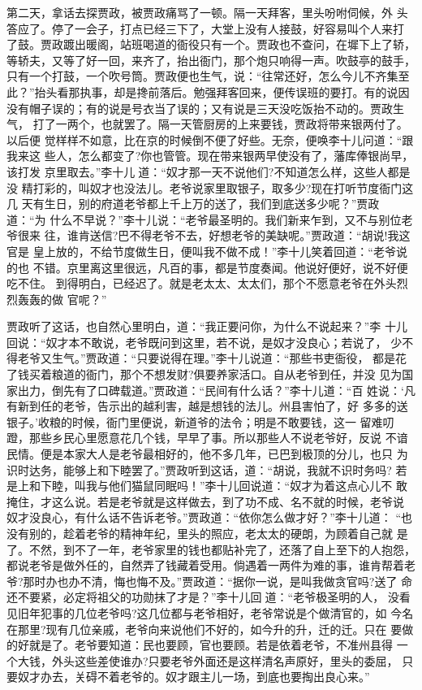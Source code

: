 第二天，拿话去探贾政，被贾政痛骂了一顿。隔一天拜客，里头吩咐伺候，外
头答应了。停了一会子，打点已经三下了，大堂上没有人接鼓，好容易叫个人来打
了鼓。贾政踱出暖阁，站班喝道的衙役只有一个。贾政也不查问，在墀下上了轿，
等轿夫，又等了好一回，来齐了，抬出衙门，那个炮只响得一声。吹鼓亭的鼓手，
只有一个打鼓，一个吹号筒。贾政便也生气，说：“往常还好，怎么今儿不齐集至
此？”抬头看那执事，却是搀前落后。勉强拜客回来，便传误班的要打。有的说因
没有帽子误的；有的说是号衣当了误的；又有说是三天没吃饭抬不动的。贾政生气，
打了一两个，也就罢了。隔一天管厨房的上来要钱，贾政将带来银两付了。以后便
觉样样不如意，比在京的时候倒不便了好些。无奈，便唤李十儿问道：“跟我来这
些人，怎么都变了?你也管管。现在带来银两早使没有了，藩库俸银尚早，该打发
京里取去。”李十儿道：“奴才那一天不说他们?不知道怎么样，这些人都是没
精打彩的，叫奴才也没法儿。老爷说家里取银子，取多少?现在打听节度衙门这几
天有生日，别的府道老爷都上千上万的送了，我们到底送多少呢？”贾政道：“为
什么不早说？”李十儿说：“老爷最圣明的。我们新来乍到，又不与别位老爷很来
往，谁肯送信?巴不得老爷不去，好想老爷的美缺呢。”贾政道：“胡说!我这官是
皇上放的，不给节度做生日，便叫我不做不成！”李十儿笑着回道：“老爷说的也
不错。京里离这里很远，凡百的事，都是节度奏闻。他说好便好，说不好便吃不住。
到得明白，已经迟了。就是老太太、太太们，那个不愿意老爷在外头烈烈轰轰的做
官呢？”

贾政听了这话，也自然心里明白，道：“我正要问你，为什么不说起来？”李
十儿回说：“奴才本不敢说，老爷既问到这里，若不说，是奴才没良心；若说了，
少不得老爷又生气。”贾政道：“只要说得在理。”李十儿说道：“那些书吏衙役，
都是花了钱买着粮道的衙门，那个不想发财?俱要养家活口。自从老爷到任，并没
见为国家出力，倒先有了口碑载道。”贾政道：“民间有什么话？”李十儿道：“百
姓说：‘凡有新到任的老爷，告示出的越利害，越是想钱的法儿。州县害怕了，好
多多的送银子。’收粮的时候，衙门里便说，新道爷的法令；明是不敢要钱，这一
留难叨蹬，那些乡民心里愿意花几个钱，早早了事。所以那些人不说老爷好，反说
不谙民情。便是本家大人是老爷最相好的，他不多几年，已巴到极顶的分儿，也只
为识时达务，能够上和下睦罢了。”贾政听到这话，道：“胡说，我就不识时务吗?
若是上和下睦，叫我与他们猫鼠同眠吗！”李十儿回说道：“奴才为着这点心儿不
敢掩住，才这么说。若是老爷就是这样做去，到了功不成、名不就的时候，老爷说
奴才没良心，有什么话不告诉老爷。”贾政道：“依你怎么做才好？”李十儿道：
“也没有别的，趁着老爷的精神年纪，里头的照应，老太太的硬朗，为顾着自己就
是了。不然，到不了一年，老爷家里的钱也都贴补完了，还落了自上至下的人抱怨，
都说老爷是做外任的，自然弄了钱藏着受用。倘遇着一两件为难的事，谁肯帮着老
爷?那时办也办不清，悔也悔不及。”贾政道：“据你一说，是叫我做贪官吗?送了
命还不要紧，必定将祖父的功勋抹了才是？”李十儿回道：“老爷极圣明的人，
没看见旧年犯事的几位老爷吗?这几位都与老爷相好，老爷常说是个做清官的，如
今名在那里?现有几位亲戚，老爷向来说他们不好的，如今升的升，迁的迁。只在
要做的好就是了。老爷要知道：民也要顾，官也要顾。若是依着老爷，不准州县得
一个大钱，外头这些差使谁办?只要老爷外面还是这样清名声原好，里头的委屈，
只要奴才办去，关碍不着老爷的。奴才跟主儿一场，到底也要掏出良心来。”

